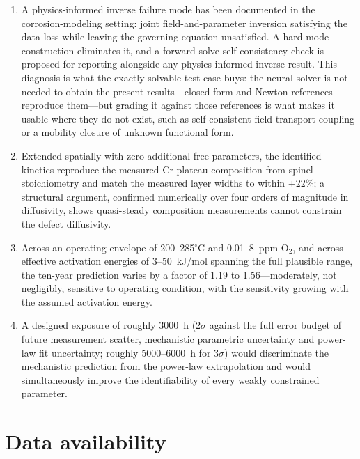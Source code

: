 \documentclass[preprint,12pt]{elsarticle}
\begin{document}
\begin{enumerate}
barrier spinels, which contains the identified value, and admitting an
outer-layer loss term reaches the FeCr$_2$O$_4$ figure at a $\chi^2$
\emph{decrease} of 0.12. Three exposure times cannot separate oxide
production from oxide loss. To our knowledge this is the first formal
identifiability characterization of a point-defect-model fit.
\item A physics-informed inverse failure mode has been documented in
the corrosion-modeling setting: joint field-and-parameter inversion
satisfying the data loss while leaving the governing equation
unsatisfied. A hard-mode construction eliminates it, and a
forward-solve self-consistency check is proposed for reporting
alongside any physics-informed inverse result. This diagnosis is what
the exactly solvable test case buys: the neural solver is not needed to
obtain the present results---closed-form and Newton references reproduce
them---but grading it against those references is what makes it usable
where they do not exist, such as self-consistent field-transport
coupling or a mobility closure of unknown functional form.
\item Extended spatially with zero additional free parameters, the
identified kinetics reproduce the measured Cr-plateau composition from
spinel stoichiometry and match the measured layer widths to within
$\pm22\%$; a structural argument, confirmed numerically over four
orders of magnitude in diffusivity, shows quasi-steady
composition measurements cannot constrain the defect diffusivity.
\item Across an operating envelope of 200--285$^\circ$C and
0.01--8~ppm O$_2$, and across effective activation energies of
3--50~kJ/mol spanning the full plausible range, the ten-year prediction
varies by a factor of 1.19 to 1.56---moderately, not negligibly,
sensitive to operating condition, with the sensitivity growing with the
assumed activation energy.
\item A designed exposure of roughly 3000~h (2$\sigma$ against the full
error budget of future measurement scatter, mechanistic parametric
uncertainty and power-law fit uncertainty; roughly 5000--6000~h for
3$\sigma$) would discriminate the mechanistic prediction from the
power-law extrapolation and would simultaneously improve the
identifiability of every weakly constrained parameter.
\end{enumerate}


\section*{Data availability}
\end{document}
